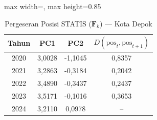 \begin{table}[H]
\centering
\caption{Pergeseran Posisi STATIS ($\mathbf{F}_k$) --- Kota Depok} \label{tab:app2jarak_statis_skor_kota_depok}
\begin{adjustbox}{max width=\textwidth, max height=0.85\textheight}
\begin{tabular}{|c|c|c|c|}
\hline
\textbf{Tahun} & \textbf{PC1} & \textbf{PC2} & \textbf{$D(\text{pos}_t, \text{pos}_{t+1})$} \\
\hline
2020 & 3,0028 & -1,1045 & 0,8357 \\
2021 & 3,2863 & -0,3184 & 0,2042 \\
2022 & 3,4890 & -0,3437 & 0,2437 \\
2023 & 3,5171 & -0,1016 & 0,3653 \\
2024 & 3,2110 & 0,0978 & -- \\
\hline
\end{tabular}
\end{adjustbox}
\end{table}